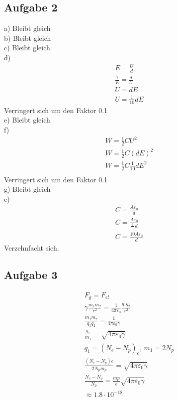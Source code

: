 \documentclass{article}
\begin{document}
\subsection*{Aufgabe 2}
a)
Bleibt gleich\\
b)
Bleibt gleich\\
c)
Bleibt gleich\\
d)\begin{eqnarray*}
    E=\frac{U}{d}\\
    \frac{1}{E}=\frac{d}{U}\\
    U=dE\\
    U=\frac{1}{10}dE
\end{eqnarray*}
Verringert sich um den Faktor 0.1\\
e)
Bleibt gleich\\
f)\begin{eqnarray*}
    W=\frac{1}{2}CU^2\\
    W=\frac{1}{2}C\left(dE\right)^2\\
    W=\frac{1}{2}C\frac{1}{10}dE^2\\
\end{eqnarray*}
Verringert sich um den Faktor 0.1\\
g)
Bleibt gleich\\
e)\begin{eqnarray*}
    C=\frac{A\varepsilon_0}{d}\\
    C=\frac{A\varepsilon_0}{\frac{1}{10}d}\\
    C=\frac{10A\varepsilon_0}{d}
\end{eqnarray*}
Verzehnfacht sich.

\subsection*{Aufgabe 3}
\begin{eqnarray*}
    F_g = F_{el}\\
    \gamma \frac{m_1m_2}{r^2}=\frac{1}{4\pi \varepsilon_0}\frac{q_1q_2}{r^2}\\
    \frac{m_1m_2}{q_1q_2}=\frac{1}{4\pi\varepsilon_0\gamma}\\
    \frac{q_1}{m_1}=\sqrt{4\pi\varepsilon_0\gamma}\\
    q_1 = (N_e-N_p)_e,\,m_1=2N_p\\
    \frac{(N_e-N_p)e}{2N_pm_p}=\sqrt{4\pi\varepsilon_0\gamma}\\
    \frac{N_e-N_p}{N_p}=\frac{mp}{e}\sqrt{4\pi\varepsilon_0\gamma}\\
    \approx 1.8\cdot 10^{-18}
\end{eqnarray*}
\end{document}
